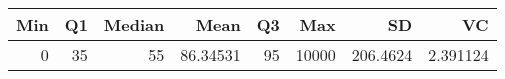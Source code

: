 
\begin{tabular}[t]{rrrrrrrr}
\toprule
Min & Q1 & Median & Mean & Q3 & Max & SD & VC\\
\midrule
0 & 35 & 55 & 86.34531 & 95 & 10000 & 206.4624 & 2.391124\\
\bottomrule
\end{tabular}